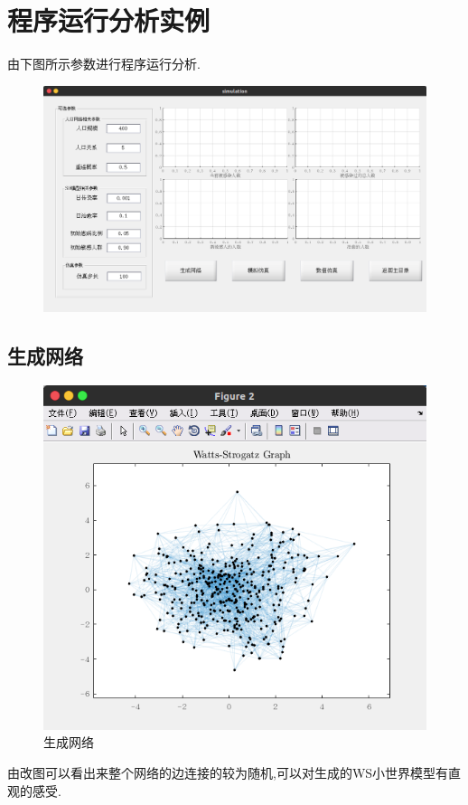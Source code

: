 \documentclass[supercite]{HustGraduPaper}
\begin{document}
	\section{程序运行分析实例}
	由下图所示参数进行程序运行分析.
	\begin{figure}[H]
		\centering
		\includegraphics[scale=0.3]{Figures/simu.png}
	\end{figure} 

	\subsection{生成网络}
	\begin{figure}[H]
		\centering
		\includegraphics[scale=0.5]{Figures/net.png}
		\caption{生成网络}
	\end{figure} 
	由改图可以看出来整个网络的边连接的较为随机,可以对生成的WS小世界模型有直观的感受.
\end{document}
